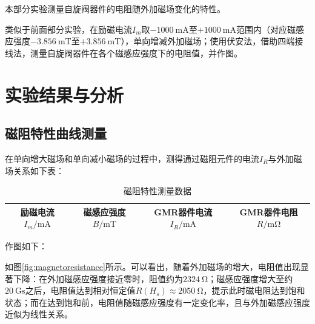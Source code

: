 \documentclass{thuemp}
\begin{document}
本部分实验测量自旋阀器件的电阻随外加磁场变化的特性。

类似于前面部分实验，在励磁电流$I_m$取$-1000 ~ \mathrm{mA} $至$+1000~ \mathrm{mA} $范围内（对应磁感应强度$-3.856 ~ \mathrm{mT}$至$+3.856 ~ \mathrm{mT}$），单向增减外加磁场；使用伏安法，借助四端接线法，测量自旋阀器件在各个磁感应强度下的电阻值，并作图。


\section{实验结果与分析}

\subsection{磁阻特性曲线测量}

在单向增大磁场和单向减小磁场的过程中，测得通过磁阻元件的电流$I_R$与外加磁场关系如下表：

\begin{table}[H]
    \centering
    \captionnamefont{\wuhao\bf\heiti}
    \captiontitlefont{\wuhao\bf\heiti}
    \caption{磁阻特性测量数据} \label{tab:magnetoresistance}
    \liuhao
    \begin{tabular}{|c|c|c|c|}
        \toprule
        励磁电流$I_m/\mathrm{mA}$ & 磁感应强度$B/\mathrm{mT}$ & GMR器件电流 $I_R /\mathrm{mA}$ & GMR器件电阻$R/\mathrm{m\Omega} $ \\ \hline
        \midrule
        \bottomrule
    \end{tabular}
\end{table}

作图如下：


如图\ref{fig:magnetoresistance}所示。可以看出，随着外加磁场的增大，电阻值出现显著下降：在外加磁感应强度接近零时，阻值约为$2324~\mathrm{\Omega}$；磁感应强度增大至约$20~\mathrm{Gs}$之后，电阻值达到相对恒定值$R(H_s)\approx 2050~\mathrm{\Omega}$，提示此时磁电阻达到饱和状态；而在达到饱和前，电阻值随磁感应强度有一定变化率，且与外加磁感应强度近似为线性关系。
\end{document}
